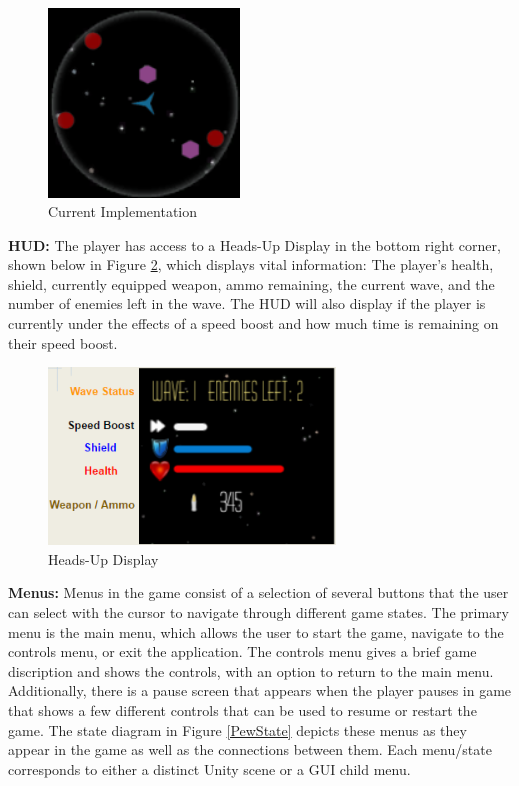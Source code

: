 \documentclass[12pt]{article}       %
\begin{document}
\begin{figure} [H]
\centering
\includegraphics[width=2in]{radarExample2.png}
\caption{Current Implementation} \label{RadarTwo}
\end{figure}

	{\bf HUD:} The player has access to a Heads-Up Display in the bottom right corner, shown below in Figure \ref{HUDDia}, which displays vital information: The player's health, shield, currently equipped weapon, ammo remaining, the current wave, and the number of enemies left in the wave. The HUD will also display if the player is currently under the effects of a speed boost and how much time is remaining on their speed boost.

\begin{figure} [H] \centering\includegraphics[width=3in] {HUDDiagram.png}\caption{Heads-Up Display} \label{HUDDia}\end{figure}

	{\bf Menus:} Menus in the game consist of a selection of several buttons that the user can select with the cursor to navigate through different game states. The primary menu is the main menu, which allows the user to start the game, navigate to the controls menu, or exit the application. The controls menu gives a brief game discription and shows the controls, with an option to return to the main menu. Additionally, there is a pause screen that appears when the player pauses in game that shows a few different controls that can be used to resume or restart the game. The state diagram in Figure \ref{PewState} depicts these menus as they appear in the game as well as the connections between them. Each menu/state corresponds to either a distinct Unity scene or a GUI child menu. 
\end{document}
